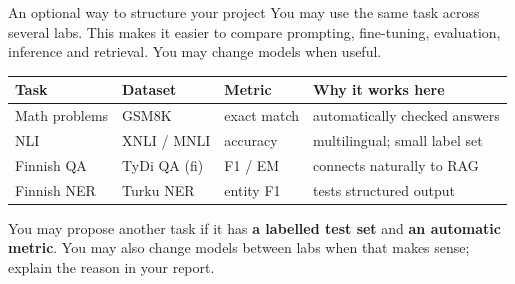 \documentclass[aspectratio=169,10pt]{beamer}
\begin{document}
\begin{frame}{An optional way to structure your project}
  You may use the same task across several labs. This makes it easier to
  compare prompting, fine-tuning, evaluation, inference and retrieval. You may
  change models when useful.
  \vspace{0.3em}
  \centering
  \renewcommand{\arraystretch}{1.12}
  \begin{tabular}{@{}L{3.0cm} L{2.5cm} L{2.2cm} L{4.3cm}@{}}
    \toprule
    \textbf{Task} & \textbf{Dataset} & \textbf{Metric} & \textbf{Why it works here}\\
    \midrule
    Math problems & GSM8K & exact match & automatically checked answers\\
    \addlinespace[0.35em]
    NLI & XNLI / MNLI & accuracy & multilingual; small label set\\
    \addlinespace[0.35em]
    Finnish QA & TyDi QA (fi) & F1 / EM & connects naturally to RAG\\
    \addlinespace[0.35em]
    Finnish NER & Turku NER & entity F1 & tests structured output\\
    \bottomrule
  \end{tabular}

  \vspace{0.4em}
  \raggedright\small
  You may propose another task if it has \textbf{a labelled test set} and
  \textbf{an automatic metric}. You may also change models between labs when
  that makes sense; explain the reason in your report.
\end{frame}
\end{document}
